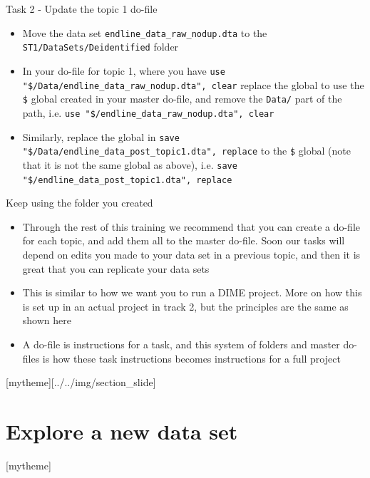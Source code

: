 \documentclass[aspectratio=169]{beamer}
\newcommand{\sectionpic}[2]{
	\setbeamertemplate{section page}[mytheme][#2]
	\section{#1}
	\setbeamertemplate{section page}[mytheme]
}
\begin{document}
\begin{frame}{Task 2 - Update the topic 1 do-file}
	\begin{itemize}
		\item Move the data set \texttt{endline\_data\_raw\_nodup.dta} to the \texttt{ST1/DataSets/Deidentified} folder
		\item In your do-file for topic 1, where you have \newline \texttt{use "\$/Data/endline\_data\_raw\_nodup.dta", clear} replace the global to use the \texttt{\$} global created in your master do-file, and remove the \texttt{Data/} part of the path, i.e. \newline  \texttt{use "\$/endline\_data\_raw\_nodup.dta", clear}
		\item Similarly, replace the global in \newline \texttt{save "\$/Data/endline\_data\_post\_topic1.dta", replace} to the \texttt{\$} global (note that it is not the same global as above), i.e. \newline  \texttt{save "\$/endline\_data\_post\_topic1.dta", replace}
	\end{itemize}

\end{frame}

\begin{frame}{Keep using the folder you created}
	\begin{itemize}
		\item Through the rest of this training we recommend that you can create a do-file for each topic, and add them all to the master do-file. Soon our tasks will depend on edits you made to your data set in a previous topic, and then it is great that you can replicate your data sets
		\item This is similar to how we want you to run a DIME project. More on how this is set up in an actual project in track 2, but the principles are the same as shown here
		\item A do-file is instructions for a task, and this system of folders and master do-files is how these task instructions becomes instructions for a full project
	\end{itemize}
\end{frame}

\sectionpic{Explore a new data set}{../../img/section_slide}
\end{document}
